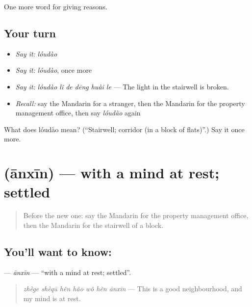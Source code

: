 \begin{grammarlens}[title={What you've built}]
One more word for giving reasons.
\end{grammarlens}

\subsection*{Your turn}
\begin{itemize}
\raggedright
  \item \emph{Say it:} \emph{lóudào}
  \item \emph{Say it:} \emph{lóudào}, once more
  \item \emph{Say it:} \emph{lóudào lǐ de dēng huài le} — The light in the stairwell is broken.
  \item \emph{Recall:} say the Mandarin for a stranger, then the Mandarin for the property management office, then say \emph{lóudào} again
\end{itemize}

\begin{tcolorbox}[breakable,colback=teal!4,colframe=teal!35!black,title={Before you move on}]
What does lóudào mean? (\textquotedblleft{}Stairwell; corridor (in a block of flats)\textquotedblright{}.) Say it once more.
\end{tcolorbox}
\section[\texorpdfstring{\zh{安心} (ānxīn)}{安心 (ānxīn)}]{ (ānxīn) — with a mind at rest; settled}

\label{lesson:ZH-C379-anxin}



\begin{quote}
Before the new one: say the Mandarin for the property management office, then the Mandarin for the stairwell of a block.
\end{quote}

\subsection*{You'll want to know: }
\textbf{} — \emph{ānxīn} — \textquotedblleft{}with a mind at rest; settled\textquotedblright{}.

\begin{quote}
\textbf{} \emph{zhège shèqū hěn hǎo wǒ hěn ānxīn} — This is a good neighbourhood, and my mind is at rest.
\end{quote}

